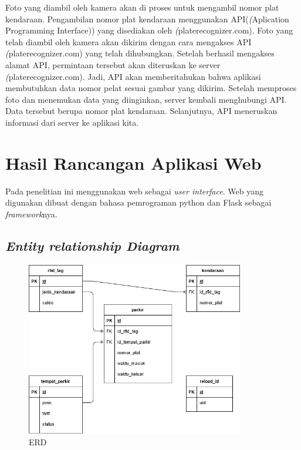 Foto yang diambil oleh kamera akan di proses untuk mengambil nomor plat kendaraan. Pengambilan nomor plat kendaraan menggunakan API(\textit(Aplication Programming Interface)) yang disediakan oleh \textit(platerecognizer.com). Foto yang telah diambil oleh kamera akan dikirim dengan cara mengakses API \textit(platerecognizer.com) yang telah dihubungkan. Setelah berhasil mengakses alamat API, permintaan tersebut akan diteruskan ke server \textit(platerecognizer.com). Jadi, API akan memberitahukan bahwa aplikasi membutuhkan data nomor pelat sesuai gambar yang dikirim. Setelah memproses foto dan menemukan data yang diinginkan, server kembali menghubungi API. Data tersebut berupa nomor plat kendaraan. Selanjutnya, API meneruskan informasi dari server ke aplikasi kita.


\section{Hasil Rancangan Aplikasi Web}
Pada penelitian ini menggunakan web sebagai \textit{user interface}. Web yang digunakan dibuat dengan bahasa pemrograman python dan Flask sebagai \textit{framework}nya.

\subsection{\textit{Entity relationship Diagram}}
\begin{figure} [H]
    \includegraphics[width=0.85\textwidth, center]{images/er diagram.png}
    \caption{ERD}
    \label{fig:erd}
\end{figure}


